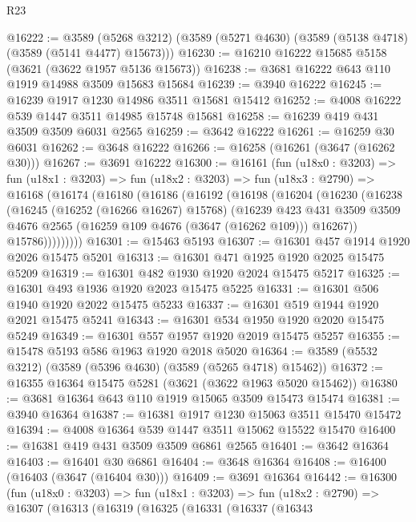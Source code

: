 \begin{lexlean}{R23}
\begin{coremodule}
@16222 := @3589
    (@5268 @3212)
    (@3589 (@5271 @4630) (@3589 (@5138 @4718) (@3589 (@5141 @4477) @15673)))
@16230 := @16210 @16222 @15685 @5158 (@3621 (@3622 @1957 @5136 @15673))
@16238 := @3681 @16222 @643 @110 @1919 @14988 @3509 @15683 @15684
@16239 := @3940 @16222
@16245 := @16239 @1917 @1230 @14986 @3511 @15681 @15412
@16252 := @4008 @16222 @539 @1447 @3511 @14985 @15748 @15681
@16258 := @16239 @419 @431 @3509 @3509 @6031 @2565
@16259 := @3642 @16222
@16261 := @16259 @30 @6031
@16262 := @3648 @16222
@16266 := @16258 (@16261 (@3647 (@16262 @30)))
@16267 := @3691 @16222
@16300 := @16161
    (fun (u18x0 : @3203) =>
    fun (u18x1 : @3203) =>
    fun (u18x2 : @3203) =>
    fun (u18x3 : @2790) =>
    @16168
      (@16174
        (@16180
          (@16186
            (@16192
              (@16198
                (@16204
                  (@16230
                    (@16238
                      (@16245
                        (@16252 (@16266 @16267) @15768)
                        (@16239
                          @423
                          @431
                          @3509
                          @3509
                          @4676
                          @2565
                          (@16259 @109 @4676 (@3647 (@16262 @109)))
                          @16267))
                      @15786)))))))))
@16301 := @15463 @5193
@16307 := @16301 @457 @1914 @1920 @2026 @15475 @5201
@16313 := @16301 @471 @1925 @1920 @2025 @15475 @5209
@16319 := @16301 @482 @1930 @1920 @2024 @15475 @5217
@16325 := @16301 @493 @1936 @1920 @2023 @15475 @5225
@16331 := @16301 @506 @1940 @1920 @2022 @15475 @5233
@16337 := @16301 @519 @1944 @1920 @2021 @15475 @5241
@16343 := @16301 @534 @1950 @1920 @2020 @15475 @5249
@16349 := @16301 @557 @1957 @1920 @2019 @15475 @5257
@16355 := @15478 @5193 @586 @1963 @1920 @2018 @5020
@16364 := @3589 (@5532 @3212) (@3589 (@5396 @4630) (@3589 (@5265 @4718) @15462))
@16372 := @16355 @16364 @15475 @5281 (@3621 (@3622 @1963 @5020 @15462))
@16380 := @3681 @16364 @643 @110 @1919 @15065 @3509 @15473 @15474
@16381 := @3940 @16364
@16387 := @16381 @1917 @1230 @15063 @3511 @15470 @15472
@16394 := @4008 @16364 @539 @1447 @3511 @15062 @15522 @15470
@16400 := @16381 @419 @431 @3509 @3509 @6861 @2565
@16401 := @3642 @16364
@16403 := @16401 @30 @6861
@16404 := @3648 @16364
@16408 := @16400 (@16403 (@3647 (@16404 @30)))
@16409 := @3691 @16364
@16442 := @16300
    (fun (u18x0 : @3203) =>
    fun (u18x1 : @3203) =>
    fun (u18x2 : @2790) =>
    @16307
      (@16313
        (@16319
          (@16325
            (@16331
              (@16337
                (@16343

\end{coremodule}
\end{lexlean}
